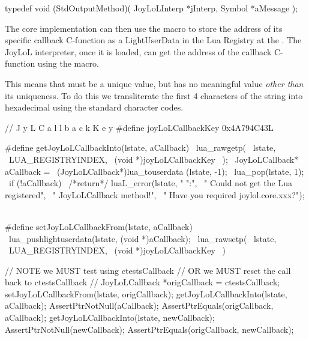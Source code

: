 typedef void (StdOutputMethod)(
  JoyLoLInterp *jInterp,
  Symbol       *aMessage
);
\stopCHeader

The core implementation can then use the  
macro to store the address of its specific callback C-function as a 
LightUserData in the Lua Registry at the . The 
JoyLoL interpreter, once it is loaded, can get the address of the callback 
C-function using the  macro. 

This means that  must be a unique value, but has no 
meaningful value \emph{other than} its uniqueness. To do this we 
transliterate the first 4 characters of the string  
into hexadecimal using the standard  character codes. 

\startCHeader
//                           J y L C a l l b a c k K e y
#define joyLoLCallbackKey 0x4A794C43L

#define getJoyLoLCallbackInto(lstate, aCallback)  \
  lua_rawgetp(                                    \
    lstate,                                       \
    LUA_REGISTRYINDEX,                            \
    (void *)joyLoLCallbackKey                     \
  );                                              \
  JoyLoLCallback* aCallback =                     \
    (JoyLoLCallback*)lua_touserdata (lstate, -1); \
  lua_pop(lstate, 1);                             \
  if (!aCallback) {                               \
    /*return*/ luaL_error(lstate, "%
      "\nERROR:\n",                               \
      "  Could not get the Lua registered\n",     \
      "  JoyLoLCallback method!\n",               \
      "  Have you required joylol.core.xxx?\n");  \
  }
\stopCHeader

\startCHeader
#define setJoyLoLCallbackFrom(lstate, aCallback)    \
  lua_pushlightuserdata(lstate, (void *)aCallback); \
  lua_rawsetp(                                      \
    lstate,                                         \
    LUA_REGISTRYINDEX,                              \
    (void *)joyLoLCallbackKey                       \
  )
\stopCHeader


\startCTest
  // NOTE we MUST test using ctestsCallback 
  // OR we MUST reset the call back to ctestsCallback
  //
  JoyLoLCallback *origCallback = ctestsCallback;
  setJoyLoLCallbackFrom(lstate, origCallback);
  getJoyLoLCallbackInto(lstate, aCallback);
  AssertPtrNotNull(aCallback);
  AssertPtrEquals(origCallback, aCallback);
  getJoyLoLCallbackInto(lstate, newCallback);
  AssertPtrNotNull(newCallback);
  AssertPtrEquals(origCallback, newCallback);  
\stopCTest
\stopTestCase
\stopTestSuite

